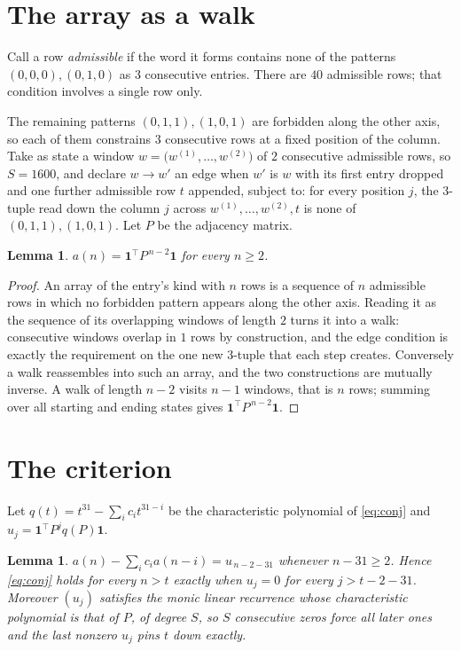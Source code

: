 \documentclass[11pt,a4paper]{article}
\theoremstyle{plain}
\newtheorem{lemma}[theorem]{Lemma}
\theoremstyle{definition}
\begin{document}
\section{The array as a walk}

Call a row \emph{admissible} if the word it forms contains none of the patterns
$(0,0,0), (0,1,0)$ as $3$ consecutive entries. There are $40$ admissible rows; that condition
involves a single row only.

The remaining patterns $(0,1,1), (1,0,1)$ are forbidden along the other axis, so each of them
constrains $3$ consecutive rows at a fixed position of the column. Take as state a
window $w=\bigl(w^{(1)},\dots,w^{(2)}\bigr)$ of $2$ consecutive admissible
rows, so $S=1600$, and declare $w\to w'$ an edge when $w'$ is $w$ with its first entry
dropped and one further admissible row $t$ appended, subject to: for every position
$j$, the $3$-tuple read down the column $j$ across $w^{(1)},\dots,w^{(2)},t$
is none of $(0,1,1), (1,0,1)$. Let $P$ be the adjacency matrix.

\begin{lemma}\label{lem:walk}
$a(n)=\mathbf{1}^{\!\top}P^{\,n-2}\mathbf{1}$ for every $n\ge2$.
\end{lemma}

\begin{proof}
An array of the entry's kind with $n$ rows is a sequence of $n$ admissible rows in
which no forbidden pattern appears along the other axis. Reading it as the sequence of its
overlapping windows of length $2$ turns it into a walk: consecutive windows overlap in
$1$ rows by construction, and the edge condition is exactly the requirement on the one
new $3$-tuple that each step creates. Conversely a walk reassembles into such an array,
and the two constructions are mutually inverse. A walk of length $n-2$ visits $n-1$
windows, that is $n$ rows; summing over all starting and ending states gives
$\mathbf{1}^{\!\top}P^{\,n-2}\mathbf{1}$.
\end{proof}

\section{The criterion}

Let $q(t)=t^{31}-\sum_i c_i t^{31-i}$ be the characteristic polynomial of
\eqref{eq:conj} and $u_j=\mathbf{1}^{\!\top}P^{j}q(P)\mathbf{1}$.

\begin{lemma}\label{lem:crit}
$a(n)-\sum_i c_i a(n-i)=u_{\,n-2-31}$ whenever $n-31\ge2$. Hence
\eqref{eq:conj} holds for every $n>t$ exactly when $u_j=0$ for every
$j>t-2-31$. Moreover $(u_j)$ satisfies the monic linear recurrence whose
characteristic polynomial is that of $P$, of degree $S$, so $S$ consecutive zeros force all
later ones and the last nonzero $u_j$ pins $t$ down exactly.
\end{lemma}
\end{document}
